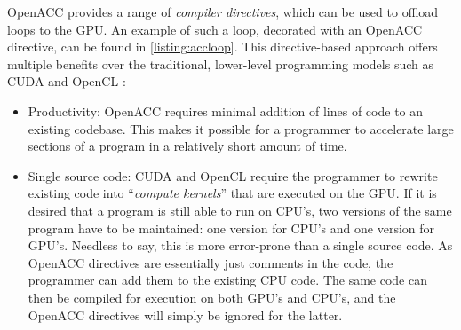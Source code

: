 OpenACC provides a range of \emph{compiler directives}, which can be used to offload loops to the GPU. An example of such a loop, decorated with an OpenACC directive, can be found in \autoref{listing:accloop}. This directive-based approach offers multiple benefits over the traditional, lower-level programming models such as CUDA and OpenCL \citep{herdmanAcceleratingHydrocodesOpenACC2012}:

\begin{itemize}
    \item Productivity: OpenACC requires minimal addition of lines of code to an existing codebase. This makes it possible for a programmer to accelerate large sections of a program in a relatively short amount of time. 
    \item Single source code: CUDA and OpenCL require the programmer to rewrite existing code into ``\emph{compute kernels}'' that are executed on the GPU. If it is desired that a program is still able to run on CPU's, two versions of the same program have to be maintained: one version for CPU's and one version for GPU's. Needless to say, this is more error-prone than a single source code. As OpenACC directives are essentially just comments in the code, the programmer can add them to the existing CPU code. The same code can then be compiled for execution on both GPU's and CPU's, and the OpenACC directives will simply be ignored for the latter.
\end{itemize}

